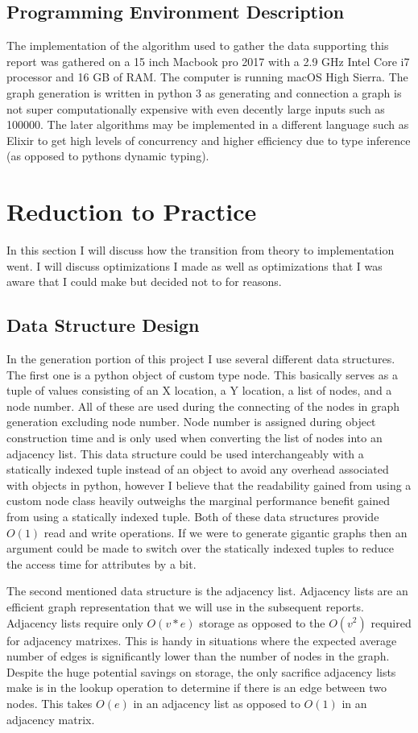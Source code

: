 \documentclass{article}
\begin{document}
  \subsection{Programming Environment Description}
		The implementation of the algorithm used to gather the data supporting this report was gathered on a 15 inch Macbook pro 2017 with a 2.9 GHz Intel Core i7 processor and 16 GB of RAM.
		The computer is running macOS High Sierra.
		The graph generation is written in python 3 as generating and connection a graph is not super computationally expensive with even decently large inputs such as 100000.
		The later algorithms may be implemented in a different language such as Elixir to get high levels of concurrency and higher efficiency due to type inference (as opposed to pythons dynamic typing).
  \section{Reduction to Practice}
		In this section I will discuss how the transition from theory to implementation went.
		I will discuss optimizations I made as well as optimizations that I was aware that I could make but decided not to for reasons.
	\subsection{Data Structure Design}
		In the generation portion of this project I use several different data structures.
		The first one is a python object of custom type node.
		This basically serves as a tuple of values consisting of an X location, a Y location, a list of nodes, and a node number.
		All of these are used during the connecting of the nodes in graph generation excluding node number.
		Node number is assigned during object construction time and is only used when converting the list of nodes into an adjacency list.
		This data structure could be used interchangeably with a statically indexed tuple instead of an object to avoid any overhead associated with objects in python, however I believe that the readability gained from using a custom node class heavily outweighs the marginal performance benefit gained from using a statically indexed tuple.
		Both of these data structures provide $O(1)$ read and write operations.
		If we were to generate gigantic graphs then an argument could be made to switch over the statically indexed tuples to reduce the access time for attributes by a bit.

		The second mentioned data structure is the adjacency list.
		Adjacency lists are an efficient graph representation that we will use in the subsequent reports.
		Adjacency lists require only $O(v*e)$ storage as opposed to the $O(v^2)$ required for adjacency matrixes.
		This is handy in situations where the expected average number of edges is significantly lower than the number of nodes in the graph.
		Despite the huge potential savings on storage, the only sacrifice adjacency lists make is in the lookup operation to determine if there is an edge between two nodes.
		This takes $O(e)$ in an adjacency list as opposed to $O(1)$ in an adjacency matrix.
\end{document}
